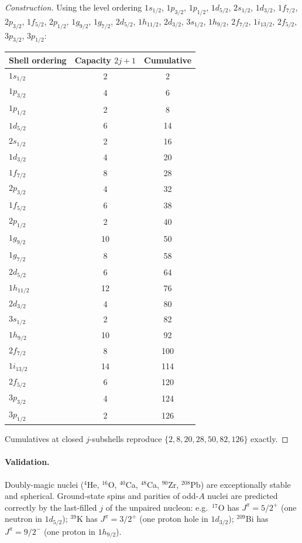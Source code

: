 \documentclass[11pt,a4paper]{article}
\theoremstyle{definition}
\theoremstyle{remark}
\begin{document}
\begin{proof}[Construction]
Using the level ordering $1s_{1/2}$, $1p_{3/2}$, $1p_{1/2}$, $1d_{5/2}$, $2s_{1/2}$, $1d_{3/2}$, $1f_{7/2}$, $2p_{3/2}$, $1f_{5/2}$, $2p_{1/2}$, $1g_{9/2}$, $1g_{7/2}$, $2d_{5/2}$, $1h_{11/2}$, $2d_{3/2}$, $3s_{1/2}$, $1h_{9/2}$, $2f_{7/2}$, $1i_{13/2}$, $2f_{5/2}$, $3p_{3/2}$, $3p_{1/2}$:

\begin{center}\small
\begin{tabular}{l c c}
\toprule
Shell ordering & Capacity $2j+1$ & Cumulative \\
\midrule
$1s_{1/2}$ & 2 & 2 \\[1pt]
$1p_{3/2}$ & 4 & 6 \\
$1p_{1/2}$ & 2 & 8 \\[1pt]
$1d_{5/2}$ & 6 & 14 \\
$2s_{1/2}$ & 2 & 16 \\
$1d_{3/2}$ & 4 & 20 \\[1pt]
$1f_{7/2}$ & 8 & 28 \\[1pt]
$2p_{3/2}$ & 4 & 32 \\
$1f_{5/2}$ & 6 & 38 \\
$2p_{1/2}$ & 2 & 40 \\
$1g_{9/2}$ & 10 & 50 \\[1pt]
$1g_{7/2}$ & 8 & 58 \\
$2d_{5/2}$ & 6 & 64 \\
$1h_{11/2}$ & 12 & 76 \\
$2d_{3/2}$ & 4 & 80 \\
$3s_{1/2}$ & 2 & 82 \\[1pt]
$1h_{9/2}$ & 10 & 92 \\
$2f_{7/2}$ & 8 & 100 \\
$1i_{13/2}$ & 14 & 114 \\
$2f_{5/2}$ & 6 & 120 \\
$3p_{3/2}$ & 4 & 124 \\
$3p_{1/2}$ & 2 & 126 \\
\bottomrule
\end{tabular}
\end{center}

Cumulatives at closed $j$-subshells reproduce $\{2,8,20,28,50,82,126\}$ exactly.
\end{proof}

\paragraph{Validation.} Doubly-magic nuclei ($^{4}$He, $^{16}$O, $^{40}$Ca, $^{48}$Ca, $^{90}$Zr, $^{208}$Pb) are exceptionally stable and spherical. Ground-state spins and parities of odd-$A$ nuclei are predicted correctly by the last-filled $j$ of the unpaired nucleon: e.g.\ $^{17}$O has $J^\pi = 5/2^+$ (one neutron in $1d_{5/2}$); $^{39}$K has $J^\pi = 3/2^+$ (one proton hole in $1d_{3/2}$); $^{209}$Bi has $J^\pi = 9/2^-$ (one proton in $1h_{9/2}$).
\end{document}
